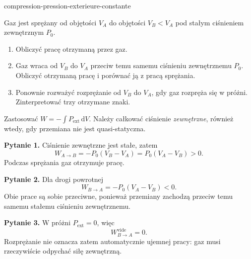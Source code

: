 \begin{exo}{compression-pression-exterieure-constante}

Gaz jest sprężany od objętości $V_A$ do objętości $V_B<V_A$ pod stałym
ciśnieniem zewnętrznym $P_0$.

\begin{enumerate}
\item Obliczyć pracę otrzymaną przez gaz.
\item Gaz wraca od $V_B$ do $V_A$ przeciw temu samemu ciśnieniu zewnętrznemu $P_0$. Obliczyć otrzymaną pracę i porównać ją z pracą sprężania.
\item Ponownie rozważyć rozprężanie od $V_B$ do $V_A$, gdy gaz rozpręża się w próżni. Zinterpretować trzy otrzymane znaki.
\end{enumerate}

\begin{indication}
Zastosować $W=-\int P_{\mathrm{ext}}\,\mathrm{d}V$. Należy całkować ciśnienie
\emph{zewnętrzne}, również wtedy, gdy przemiana nie jest quasi-statyczna.
\end{indication}

\begin{solution}
\textbf{Pytanie 1.} Ciśnienie zewnętrzne jest stałe, zatem
\[W_{A\to B}=-P_0(V_B-V_A)=P_0(V_A-V_B)>0.\]
Podczas sprężania gaz otrzymuje pracę.

\textbf{Pytanie 2.} Dla drogi powrotnej
\[W_{B\to A}=-P_0(V_A-V_B)<0.\]
Obie prace są sobie przeciwne, ponieważ przemiany zachodzą przeciw temu samemu
stałemu ciśnieniu zewnętrznemu.

\textbf{Pytanie 3.} W próżni $P_{\mathrm{ext}}=0$, więc
\[W_{B\to A}^{\mathrm{vide}}=0.\]
Rozprężanie nie oznacza zatem automatycznie ujemnej pracy: gaz musi rzeczywiście
odpychać siłę zewnętrzną.
\end{solution}
\end{exo}
